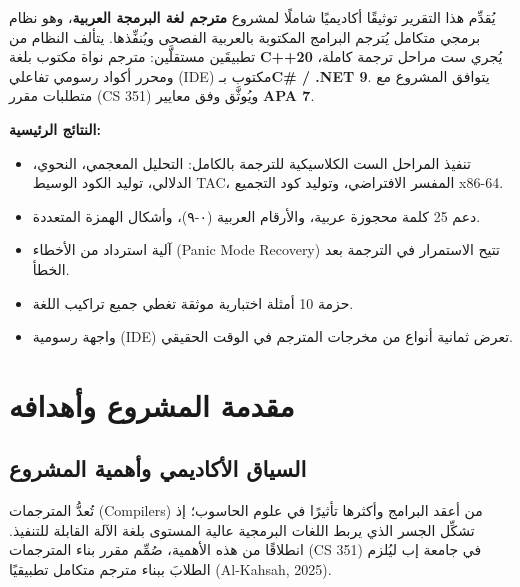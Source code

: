 \documentclass[12pt,a4paper]{report}
\begin{document}
\begin{KeyBox}[title={ملخص المشروع}]
\arabicfont
يُقدِّم هذا التقرير توثيقًا أكاديميًا شاملًا لمشروع \textbf{مترجم لغة البرمجة العربية}، وهو نظام برمجي متكامل يُترجم البرامج المكتوبة بالعربية الفصحى ويُنفِّذها. يتألف النظام من تطبيقَين مستقلَّين: مترجم نواة مكتوب بلغة \textbf{C++20} يُجري ست مراحل ترجمة كاملة، ومحرر أكواد رسومي تفاعلي (IDE) مكتوب بـ\textbf{C\# / .NET 9}. يتوافق المشروع مع متطلبات مقرر (CS 351) ويُوثَّق وفق معايير \textbf{APA 7}.
\end{KeyBox}

\vspace{0.5cm}

\textbf{\arabicfont النتائج الرئيسية:}
\begin{itemize}[rightmargin=1cm]
    \item تنفيذ المراحل الست الكلاسيكية للترجمة بالكامل: التحليل المعجمي، النحوي، الدلالي، توليد الكود الوسيط TAC، المفسر الافتراضي، وتوليد كود التجميع x86-64.
    \item دعم 25 كلمة محجوزة عربية، والأرقام العربية (٠-٩)، وأشكال الهمزة المتعددة.
    \item آلية استرداد من الأخطاء (Panic Mode Recovery) تتيح الاستمرار في الترجمة بعد الخطأ.
    \item حزمة 10 أمثلة اختبارية موثقة تغطي جميع تراكيب اللغة.
    \item واجهة رسومية (IDE) تعرض ثمانية أنواع من مخرجات المترجم في الوقت الحقيقي.
\end{itemize}

\newpage

\tableofcontents
\newpage
\listoffigures
\newpage
\listoftables
\newpage

\chapter{مقدمة المشروع وأهدافه}

\section{السياق الأكاديمي وأهمية المشروع}

تُعدُّ المترجمات (Compilers) من أعقد البرامج وأكثرها تأثيرًا في علوم الحاسوب؛ إذ تشكِّل الجسر الذي يربط اللغات البرمجية عالية المستوى بلغة الآلة القابلة للتنفيذ. انطلاقًا من هذه الأهمية، صُمِّم مقرر بناء المترجمات (CS 351) في جامعة إب ليُلزم الطلابَ ببناء مترجم متكامل تطبيقيًا (Al-Kahsah, 2025).
\end{document}
